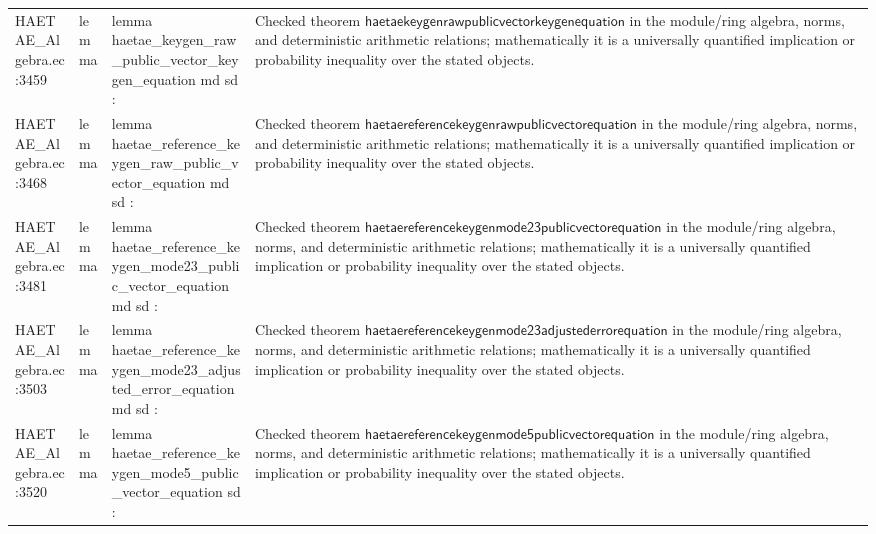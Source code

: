 \documentclass[10pt]{article}
\begin{document}
\begin{longtable}{L{0.11\textwidth}L{0.055\textwidth}L{0.385\textwidth}L{0.41\textwidth}}
HAETAE\_\allowbreak{}Algebra.\allowbreak{}ec:\allowbreak{}3459 & lemma & {\ttfamily\scriptsize lemma haetae\_\allowbreak{}keygen\_\allowbreak{}raw\_\allowbreak{}public\_\allowbreak{}vector\_\allowbreak{}keygen\_\allowbreak{}equation md sd :} & Checked theorem $\mathsf{haetaekeygenrawpublicvectorkeygenequation}$ in the module/ring algebra, norms, and deterministic arithmetic relations; mathematically it is a universally quantified implication or probability inequality over the stated objects. \\
HAETAE\_\allowbreak{}Algebra.\allowbreak{}ec:\allowbreak{}3468 & lemma & {\ttfamily\scriptsize lemma haetae\_\allowbreak{}reference\_\allowbreak{}keygen\_\allowbreak{}raw\_\allowbreak{}public\_\allowbreak{}vector\_\allowbreak{}equation md sd :} & Checked theorem $\mathsf{haetaereferencekeygenrawpublicvectorequation}$ in the module/ring algebra, norms, and deterministic arithmetic relations; mathematically it is a universally quantified implication or probability inequality over the stated objects. \\
HAETAE\_\allowbreak{}Algebra.\allowbreak{}ec:\allowbreak{}3481 & lemma & {\ttfamily\scriptsize lemma haetae\_\allowbreak{}reference\_\allowbreak{}keygen\_\allowbreak{}mode23\_\allowbreak{}public\_\allowbreak{}vector\_\allowbreak{}equation md sd :} & Checked theorem $\mathsf{haetaereferencekeygenmode23publicvectorequation}$ in the module/ring algebra, norms, and deterministic arithmetic relations; mathematically it is a universally quantified implication or probability inequality over the stated objects. \\
HAETAE\_\allowbreak{}Algebra.\allowbreak{}ec:\allowbreak{}3503 & lemma & {\ttfamily\scriptsize lemma haetae\_\allowbreak{}reference\_\allowbreak{}keygen\_\allowbreak{}mode23\_\allowbreak{}adjusted\_\allowbreak{}error\_\allowbreak{}equation md sd :} & Checked theorem $\mathsf{haetaereferencekeygenmode23adjustederrorequation}$ in the module/ring algebra, norms, and deterministic arithmetic relations; mathematically it is a universally quantified implication or probability inequality over the stated objects. \\
HAETAE\_\allowbreak{}Algebra.\allowbreak{}ec:\allowbreak{}3520 & lemma & {\ttfamily\scriptsize lemma haetae\_\allowbreak{}reference\_\allowbreak{}keygen\_\allowbreak{}mode5\_\allowbreak{}public\_\allowbreak{}vector\_\allowbreak{}equation sd :} & Checked theorem $\mathsf{haetaereferencekeygenmode5publicvectorequation}$ in the module/ring algebra, norms, and deterministic arithmetic relations; mathematically it is a universally quantified implication or probability inequality over the stated objects. \\

\end{longtable}
\end{document}
